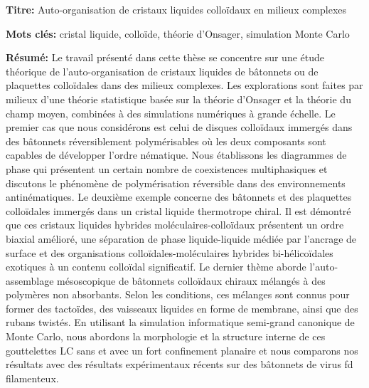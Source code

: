 \documentclass[french,12pt,a4paper]{book}
\begin{document}
\small

\begin{mdframed}[linecolor=Prune,linewidth=1]

\textbf{Titre:} Auto-organisation de cristaux liquides colloïdaux en milieux complexes

\noindent \textbf{Mots clés:} cristal liquide, colloïde, théorie d'Onsager, simulation Monte Carlo

\begin{multicols}{2}
\noindent \textbf{Résumé:} Le travail présenté dans cette thèse se concentre sur une étude théorique de l'auto-organisation de cristaux liquides de bâtonnets ou de plaquettes colloïdales dans des milieux complexes. Les explorations sont faites par milieux d'une théorie statistique basée sur la théorie d'Onsager et la théorie du champ moyen, combinées à des simulations numériques à grande échelle. Le premier cas que nous considérons est celui de disques colloïdaux immergés dans des bâtonnets réversiblement polymérisables où les deux composants sont capables de développer l'ordre nématique. Nous établissons les diagrammes de phase qui présentent un certain nombre de coexistences multiphasiques et discutons le phénomène de polymérisation réversible dans des environnements antinématiques. Le deuxième exemple concerne des bâtonnets et des plaquettes colloïdales immergés dans un cristal liquide thermotrope chiral. Il est démontré que ces cristaux liquides hybrides moléculaires-colloïdaux présentent un ordre biaxial amélioré, une séparation de phase liquide-liquide médiée par l'ancrage de surface et des organisations colloïdales-moléculaires hybrides bi-hélicoïdales exotiques à un contenu colloïdal significatif. Le dernier thème aborde l'auto-assemblage mésoscopique de bâtonnets colloïdaux chiraux mélangés à des polymères non absorbants. Selon les conditions, ces mélanges sont connus pour former des tactoïdes, des vaisseaux liquides en forme de membrane, ainsi que des rubans twistés.  En utilisant la simulation informatique semi-grand canonique de Monte Carlo, nous abordons la morphologie et la structure interne de ces gouttelettes LC sans et avec un fort confinement planaire et nous comparons nos résultats avec des résultats expérimentaux récents sur des bâtonnets de virus fd filamenteux.
\end{multicols}

\end{mdframed}

\vspace{8mm}
\end{document}

